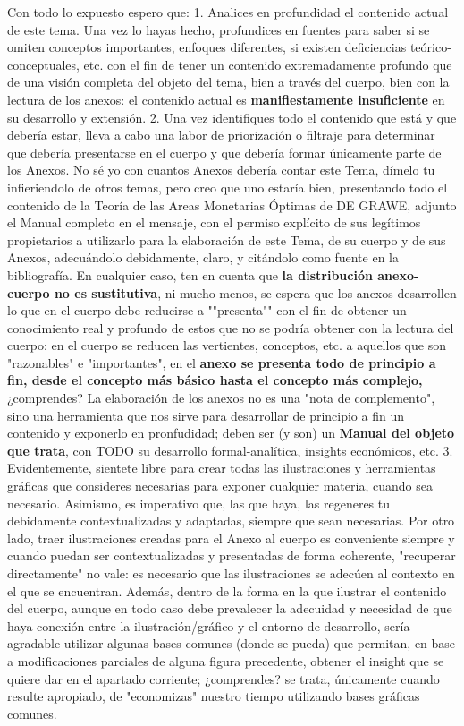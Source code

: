 \documentclass[10pt,a4paper]{article}
\newcounter{anexo}
\begin{document}
{{    Con todo lo expuesto espero que:
    1. Analices en profundidad el contenido actual de este tema. Una vez lo hayas hecho, profundices en fuentes para saber si se omiten conceptos importantes, enfoques diferentes, si existen deficiencias teórico-conceptuales, etc. con el fin de tener un contenido extremadamente profundo que de una visión completa del objeto del tema, bien a través del cuerpo, bien con la lectura de los anexos: el contenido actual es \textbf{manifiestamente insuficiente} en su desarrollo y extensión. 
    2. Una vez identifiques todo el contenido que está y que debería estar, lleva a cabo una labor de priorización o filtraje para determinar que debería presentarse en el cuerpo y que debería formar únicamente parte de los Anexos. No sé yo con cuantos Anexos debería contar este Tema, dímelo tu infieriendolo de otros temas, pero creo que uno estaría bien, presentando todo el contenido de la Teoría de las Areas Monetarias Óptimas de DE GRAWE, adjunto el Manual completo en el mensaje, con el permiso explícito de sus legítimos propietarios a utilizarlo para la elaboración de este Tema, de su cuerpo y de sus Anexos, adecuándolo debidamente, claro, y citándolo como fuente en la bibliografía.
    En cualquier caso, ten en cuenta que \textbf{la distribución anexo-cuerpo no es sustitutiva}, ni mucho menos, se espera que los anexos desarrollen lo que en el cuerpo debe reducirse a ""presenta"" con el fin de obtener un conocimiento real y profundo de estos que no se podría obtener con la lectura del cuerpo: en el cuerpo se reducen las vertientes, conceptos, etc. a aquellos que son "razonables" e "importantes", en el \textbf{anexo se presenta todo de principio a fin, desde el concepto más básico hasta el concepto más complejo,} ¿comprendes? La elaboración de los anexos no es una "nota de complemento", sino una herramienta que nos sirve para desarrollar de principio a fin un contenido y exponerlo en pronfudidad; deben ser (y son) un \textbf{Manual del objeto que trata}, con TODO su desarrollo formal-analítica, insights económicos, etc. 
    3. Evidentemente, sientete libre para crear todas las ilustraciones y herramientas gráficas que consideres necesarias para exponer cualquier materia, cuando sea necesario. Asimismo, es imperativo que, las que haya, las regeneres tu debidamente contextualizadas y adaptadas, siempre que sean necesarias. Por otro lado, traer ilustraciones creadas para el Anexo al cuerpo es conveniente siempre y cuando puedan ser contextualizadas y presentadas de forma coherente, "recuperar directamente" no vale: es necesario que las ilustraciones se adecúen al contexto en el que se encuentran. Además, dentro de la forma en la que ilustrar el contenido del cuerpo, aunque en todo caso debe prevalecer la adecuidad y necesidad de que haya conexión entre la ilustración/gráfico y el entorno de desarrollo, sería agradable utilizar algunas bases comunes (donde se pueda) que permitan, en base a modificaciones parciales de alguna figura precedente, obtener el insight que se quiere dar en el apartado corriente; ¿comprendes? se trata, únicamente cuando resulte apropiado, de "economizas" nuestro tiempo utilizando bases gráficas comunes.
}}
\end{document}
